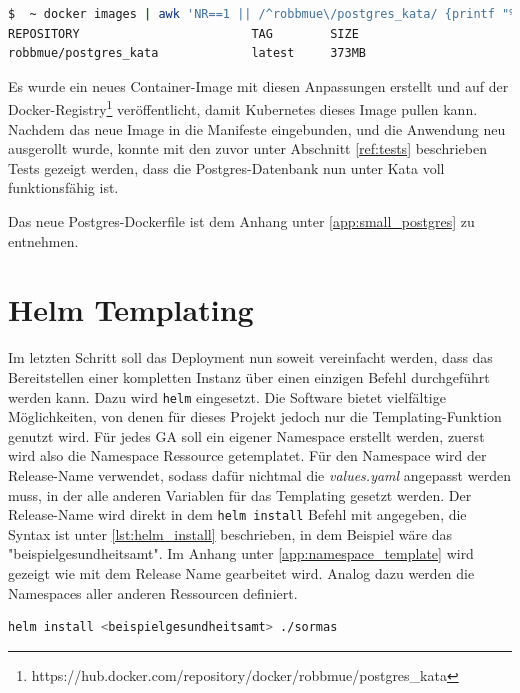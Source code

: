 \begin{lstlisting}[language=bash, caption={Größe des Debian Images}, label=lst:debian_postgres_size]
$  ~ docker images | awk 'NR==1 || /^robbmue\/postgres_kata/ {printf "%-33s %-10s %s\n", $1, $2, $NF}'
REPOSITORY                        TAG        SIZE
robbmue/postgres_kata             latest     373MB
\end{lstlisting}

Es wurde ein neues Container-Image mit diesen Anpassungen erstellt und auf der Docker-Registry\footnote{https://hub.docker.com/repository/docker/robbmue/postgres\_kata} veröffentlicht, damit Kubernetes dieses Image pullen kann.
Nachdem das neue Image in die Manifeste eingebunden, und die Anwendung neu ausgerollt wurde, konnte mit den zuvor unter Abschnitt \ref{ref:tests} beschrieben Tests gezeigt werden, dass die Postgres-Datenbank nun unter Kata voll funktionsfähig ist.

Das neue Postgres-Dockerfile ist dem Anhang unter \ref{app:small_postgres} zu entnehmen.


\section{Helm Templating}
Im letzten Schritt soll das Deployment nun soweit vereinfacht werden, dass das Bereitstellen einer kompletten Instanz über einen einzigen Befehl durchgeführt werden kann.
Dazu wird \texttt{helm} eingesetzt. 
Die Software bietet vielfältige Möglichkeiten, von denen für dieses Projekt jedoch nur die Templating-Funktion genutzt wird.
Für jedes \ac{GA} soll ein eigener Namespace erstellt werden, zuerst wird also die Namespace Ressource getemplatet.
Für den Namespace wird der Release-Name verwendet, sodass dafür nichtmal die \textit{values.yaml} angepasst werden muss, in der alle anderen Variablen für das Templating gesetzt werden. 
Der Release-Name wird direkt in dem \texttt{helm install} Befehl mit angegeben, die Syntax ist unter \ref{lst:helm_install} beschrieben, in dem Beispiel wäre das "beispielgesundheitsamt".
Im Anhang unter \ref{app:namespace_template} wird gezeigt wie mit dem Release Name gearbeitet wird. 
Analog dazu werden die Namespaces aller anderen Ressourcen definiert. 

\begin{lstlisting}[language=bash, caption={Syntax des \texttt{helm install} Kommanods}, label=lst:helm_install]
helm install <beispielgesundheitsamt> ./sormas
\end{lstlisting}


